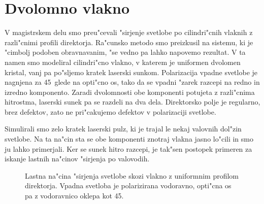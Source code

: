 \documentclass[12pt,twoside,openright,final]{report}
\begin{document}
\section{Dvolomno vlakno}
V magistrskem delu smo preu"cevali "sirjenje svetlobe po cilindri"cnih vlaknih z razli"cnimi profili direktorja. 
Ra"cunsko metodo smo preizkusil na sistemu, ki je "cimbolj podoben obravnavanim, "se vedno pa lahko napovemo rezultat. 
V ta namen smo modeliral cilindri"cno vlakno, v katerem je uniformen dvolomen kristal, vanj pa po"sljemo kratek laserski sunkom. 
Polarizacija vpadne svetlobe je nagnjena za 45\degree~glede na opti"cno os, tako da se vpadni "zarek razcepi na redno in izredno komponento. 
Zaradi dvolomnosti obe komponenti potujeta z razli"cnima hitrostma, laserski sunek pa se razdeli na dva dela. 
Direktorsko polje je regularno, brez defektov, zato ne pri"cakujemo defektov v polarizaciji svetlobe. 

Simulirali smo zelo kratek laserski pulz, ki je trajal le nekaj valovnih dol"zin svetlobe. 
Na ta na"cin sta se obe komponenti znotraj vlakna jasno lo"cili in smo ju lahko primerjali. 
Ker se sunek hitro razcepi, je tak"sen postopek primeren za iskanje lastnih na"cinov "sirjenja po valovodih\cite{taflove}. 

\begin{figure}[!htbp]
 \centering
 \caption{Lastna na"cina "sirjenja svetlobe skozi vlakno z uniformnim profilom direktorja. Vpadna svetloba je polarizirana vodoravno, opti"cna os pa z vodoravnico oklepa kot 45\degree. }
 \label{fig:pulse-0-mode}
\end{figure}
\end{document}
